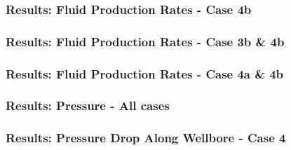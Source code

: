 \begin{frame}
    \frametitle{Results: Fluid Production Rates - Case 4b}
    \centerline{}
\end{frame}

\begin{frame}
    \frametitle{Results: Fluid Production Rates - Case 3b \& 4b}
    \centerline{}
\end{frame}

\begin{frame}
    \frametitle{Results: Fluid Production Rates - Case 4a \& 4b}
    \centerline{}
\end{frame}


\begin{frame}
    \frametitle{Results: Pressure - All cases}
    \centerline{}
\end{frame}


\begin{frame}
    \frametitle{Results: Pressure Drop Along Wellbore - Case 4}
    \centerline{}
\end{frame}
